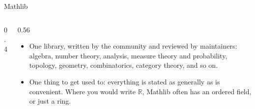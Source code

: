 \documentclass[10pt, aspectratio=169]{beamer}
\begin{document}
\begin{frame}[fragile]{Mathlib}
\begin{columns}[T]
\begin{column}{0.4\textwidth}
\end{column}
\begin{column}{0.56\textwidth}
\begin{itemize}
\item One library, written by the community and reviewed by maintainers: algebra, number theory, analysis, measure theory and probability, topology, geometry, combinatorics, category theory, and so on.
\item One thing to get used to: everything is stated as generally as is convenient. Where you would write $\mathbb{R}$, Mathlib often has an ordered field, or just a ring.
\end{itemize}
\end{column}
\end{columns}

\end{frame}
\end{document}
